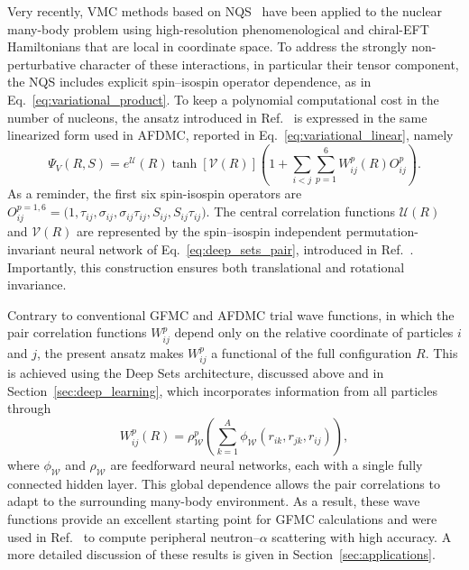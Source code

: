 Very recently, VMC methods based on NQS~\cite{yang_chiral_2025,yang_zemach_2025,wen_neural-network_2025} have been applied to the nuclear many-body problem using high-resolution phenomenological and chiral-EFT Hamiltonians that are local in coordinate space. To address the strongly non-perturbative character of these interactions, in particular their tensor component, the NQS includes explicit spin–isospin operator dependence, as in Eq.~\eqref{eq:variational_product}. To keep a polynomial computational cost  in the number of nucleons, the ansatz introduced in Ref.~\cite{yang_chiral_2025} is expressed in the same linearized form used in AFDMC, reported in Eq.~\eqref{eq:variational_linear}, namely
\begin{equation}
\Psi_V(R,S) = e^\mathcal{U}(R) \tanh[\mathcal{V}(R)]
\left( 1 + \sum_{i<j}\sum_{p=1}^6 W^p_{ij}(R) O^p_{ij} \right).
\label{eq:SJ_chiral}
\end{equation}
As a reminder, the first six spin-isospin operators are $O^{p=1,6}_{ij} = \bigl( 1, \tau_{ij}, \sigma_{ij}, \sigma_{ij} \tau_{ij}, S_{ij}, S_{ij} \tau_{ij}\bigr)$. The central correlation functions $\mathcal{U}(R)$ and $\mathcal{V}(R)$ are represented by the spin–isospin independent permutation-invariant neural network of Eq.~\eqref{eq:deep_sets_pair}, introduced in Ref.~\cite{yang_consistent_2022}. Importantly, this construction ensures both translational and rotational invariance. 

Contrary to conventional GFMC and AFDMC trial wave functions, in which the pair
correlation functions $W^p_{ij}$ depend only on the relative coordinate of
particles $i$ and $j$, the present ansatz makes $W^p_{ij}$ a functional of the
full configuration $R$. This is achieved using the Deep Sets architecture, discussed above and in Section~\ref{sec:deep_learning}, which incorporates information from all particles through
\begin{equation}
W^p_{ij}(R) =
\rho_{\mathcal{W}}^p\!\left(
\sum_{k=1}^A \phi_{\mathcal{W}}(r_{ik}, r_{jk}, r_{ij})
\right),
\label{eq:SJ_chiral_2}
\end{equation}
where $\phi_{\mathcal{W}}$ and $\rho_{\mathcal{W}}$ are feedforward neural networks, each with a single fully connected hidden layer. This global dependence allows the pair correlations to adapt to the surrounding many-body environment. As a result, these wave functions provide an excellent starting point for GFMC calculations and were used in Ref.~\cite{yang_chiral_2025} to compute peripheral neutron--$\alpha$ scattering with high accuracy. A more detailed discussion of these results is given in Section~\ref{sec:applications}.



